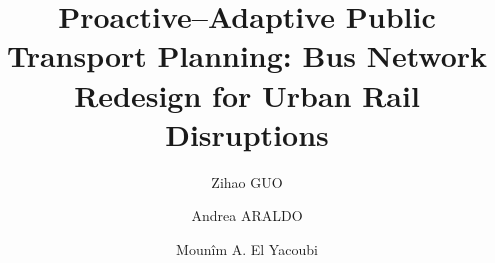 \documentclass[3p,times,procedia]{elsarticle}
\begin{document}
\begin{frontmatter}



%

\title{Proactive–Adaptive Public Transport Planning: Bus Network Redesign for Urban Rail Disruptions}


\author[a]{Zihao GUO} 
\author[a]{Andrea ARALDO}
\author[a]{Mounîm A. El Yacoubi}

\address[a]{SAMOVAR, T\'el\'ecom SudParis, Institut Polytechnique de Paris, 91120 Palaiseau, France}


\end{frontmatter}
\end{document}
